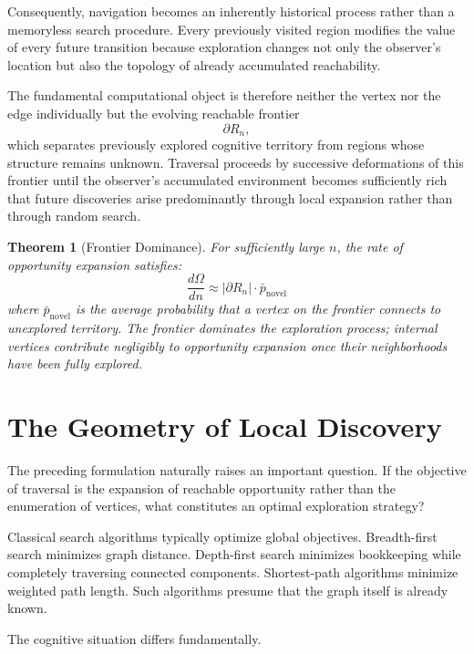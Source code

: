 \documentclass[12pt,oneside]{article}
\newtheorem{theorem}[definition]{Theorem}
\theoremstyle{remark}
\begin{document}
Consequently, navigation becomes an inherently historical process rather than a memoryless search procedure. Every previously visited region modifies the value of every future transition because exploration changes not only the observer's location but also the topology of already accumulated reachability.

The fundamental computational object is therefore neither the vertex nor the edge individually but the evolving reachable frontier
\[
\partial R_n,
\]
which separates previously explored cognitive territory from regions whose structure remains unknown. Traversal proceeds by successive deformations of this frontier until the observer's accumulated environment becomes sufficiently rich that future discoveries arise predominantly through local expansion rather than through random search.

\begin{theorem}[Frontier Dominance]
For sufficiently large \(n\), the rate of opportunity expansion satisfies:
\[
\frac{d\Omega}{dn} \approx |\partial R_n| \cdot \bar{p}_{\text{novel}}
\]
where \(\bar{p}_{\text{novel}}\) is the average probability that a vertex on the frontier connects to unexplored territory. The frontier dominates the exploration process; internal vertices contribute negligibly to opportunity expansion once their neighborhoods have been fully explored.
\end{theorem}



\section{The Geometry of Local Discovery}

The preceding formulation naturally raises an important question. If the objective of traversal is the expansion of reachable opportunity rather than the enumeration of vertices, what constitutes an optimal exploration strategy?

Classical search algorithms typically optimize global objectives. Breadth-first search minimizes graph distance. Depth-first search minimizes bookkeeping while completely traversing connected components. Shortest-path algorithms minimize weighted path length. Such algorithms presume that the graph itself is already known.

The cognitive situation differs fundamentally.
\end{document}
